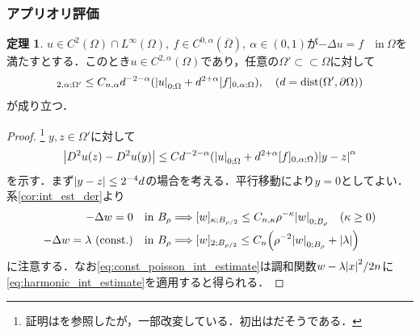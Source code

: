 \documentclass[a4paper]{ltjsarticle}
\newcommand{\Om}{\Omega}
\newcommand{\pOm}{\partial\Omega}
\newcommand{\Ombar}{\overline{\Omega}}
\newcommand{\ssubset}{\subset\subset}
\newcommand{\inn}{\quad\text{in}\ }
\newcommand{\1}{\mathbbm{1}}
\DeclareMathOperator{\dist}{\mathrm{dist}}
\numberwithin{equation}{section}
\theoremstyle{definition}
\newtheorem{thm}{定理}[section]
\begin{document}
\subsubsection{アプリオリ評価}
\begin{thm}\label{thm:schauder_laplacian_apriori}
    $u\in C^{2}(\Om)\cap L^\infty(\Om),\ f\in C^{0,\alpha}(\Ombar),\ \alpha\in(0,1)$が$-\Delta u=f\inn\Om$を満たすとする．このとき$u\in C^{2,\alpha}(\Om)$であり，任意の$\Om'\ssubset \Om$に対して
    \begin{equation}
        [u]_{2,\alpha;\Om'}\leq C_{n,\alpha}d^{-2-\alpha}(\abs{u}_{0;\Om}+d^{2+\alpha}[f]_{0,\alpha;\Om}),\quad (d=\dist(\Om',\pOm))
    \end{equation}
    が成り立つ．
\end{thm}
\begin{proof}\footnote{証明は\cite[Theorem 2.14]{fr}を参照したが，一部改変している．初出は\cite{wan06}だそうである．}
    $y,z\in\Om'$に対して
    \begin{equation}
        \abs{D^2u(z)-D^2u(y)}\leq C d^{-2-\alpha}(\abs{u}_{0;\Om}+d^{2+\alpha}[f]_{0,\alpha;\Om})\abs{y-z}^{\alpha} 
    \end{equation}
    を示す．まず$\abs{y-z}\leq 2^{-4}d$の場合を考える．平行移動により$y=0$としてよい．系\ref{cor:int_est_der}より
    \begin{align}
        -\Delta w=0\inn B_{\rho}&\Longrightarrow [w]_{\kappa;B_{\rho/2}}\leq C_{n,\kappa} \rho^{-\kappa}\abs{w}_{0;B_{\rho}}\quad (\kappa\geq0)\label{eq:harmonic_int_estimate}\\
        -\Delta w=\lambda\ \text{(const.)}\inn B_{\rho}&\Longrightarrow [w]_{2;B_{\rho/2}}\leq C_n \qty(\rho^{-2}\abs{w}_{0;B_{\rho}}+\abs{\lambda })\label{eq:const_poisson_int_estimate}
    \end{align}
    に注意する．なお\eqref{eq:const_poisson_int_estimate}は調和関数$w-\lambda\abs{x}^2/2n$に\eqref{eq:harmonic_int_estimate}を適用すると得られる．


\end{proof}
\end{document}
